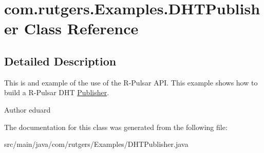 \hypertarget{classcom_1_1rutgers_1_1Examples_1_1DHTPublisher}{}\section{com.\+rutgers.\+Examples.\+D\+H\+T\+Publisher Class Reference}
\label{classcom_1_1rutgers_1_1Examples_1_1DHTPublisher}


\subsection{Detailed Description}
This is and example of the use of the R-\/\+Pulsar A\+PI. This example shows how to build a R-\/\+Pulsar D\+HT \hyperlink{classcom_1_1rutgers_1_1Examples_1_1Publisher}{Publisher}. \begin{DoxyAuthor}{Author}
eduard 
\end{DoxyAuthor}


The documentation for this class was generated from the following file\+:\begin{DoxyCompactItemize}
\item 
src/main/java/com/rutgers/\+Examples/D\+H\+T\+Publisher.\+java\end{DoxyCompactItemize}
